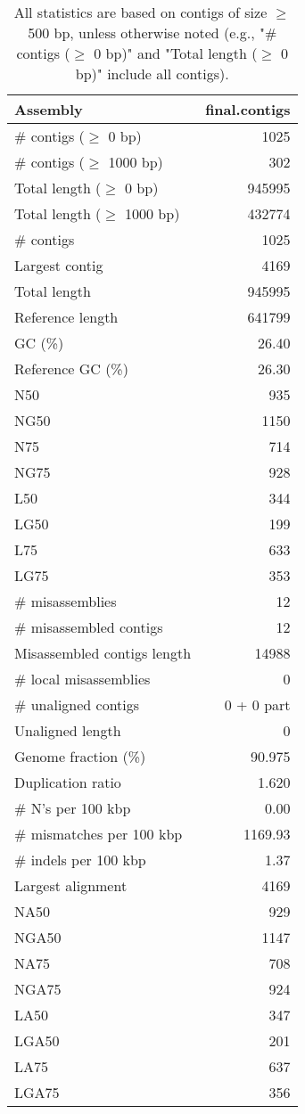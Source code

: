 \documentclass[12pt,a4paper]{article}
\begin{document}
\begin{table}[ht]
\begin{center}
\caption{All statistics are based on contigs of size $\geq$ 500 bp, unless otherwise noted (e.g., "\# contigs ($\geq$ 0 bp)" and "Total length ($\geq$ 0 bp)" include all contigs).}
\begin{tabular}{|l*{1}{|r}|}
\hline
Assembly & final.contigs \\ \hline
\# contigs ($\geq$ 0 bp) & 1025 \\ \hline
\# contigs ($\geq$ 1000 bp) & 302 \\ \hline
Total length ($\geq$ 0 bp) & 945995 \\ \hline
Total length ($\geq$ 1000 bp) & 432774 \\ \hline
\# contigs & 1025 \\ \hline
Largest contig & 4169 \\ \hline
Total length & 945995 \\ \hline
Reference length & 641799 \\ \hline
GC (\%) & 26.40 \\ \hline
Reference GC (\%) & 26.30 \\ \hline
N50 & 935 \\ \hline
NG50 & 1150 \\ \hline
N75 & 714 \\ \hline
NG75 & 928 \\ \hline
L50 & 344 \\ \hline
LG50 & 199 \\ \hline
L75 & 633 \\ \hline
LG75 & 353 \\ \hline
\# misassemblies & 12 \\ \hline
\# misassembled contigs & 12 \\ \hline
Misassembled contigs length & 14988 \\ \hline
\# local misassemblies & 0 \\ \hline
\# unaligned contigs & 0 + 0 part \\ \hline
Unaligned length & 0 \\ \hline
Genome fraction (\%) & 90.975 \\ \hline
Duplication ratio & 1.620 \\ \hline
\# N's per 100 kbp & 0.00 \\ \hline
\# mismatches per 100 kbp & 1169.93 \\ \hline
\# indels per 100 kbp & 1.37 \\ \hline
Largest alignment & 4169 \\ \hline
NA50 & 929 \\ \hline
NGA50 & 1147 \\ \hline
NA75 & 708 \\ \hline
NGA75 & 924 \\ \hline
LA50 & 347 \\ \hline
LGA50 & 201 \\ \hline
LA75 & 637 \\ \hline
LGA75 & 356 \\ \hline
\end{tabular}
\end{center}
\end{table}
\end{document}
